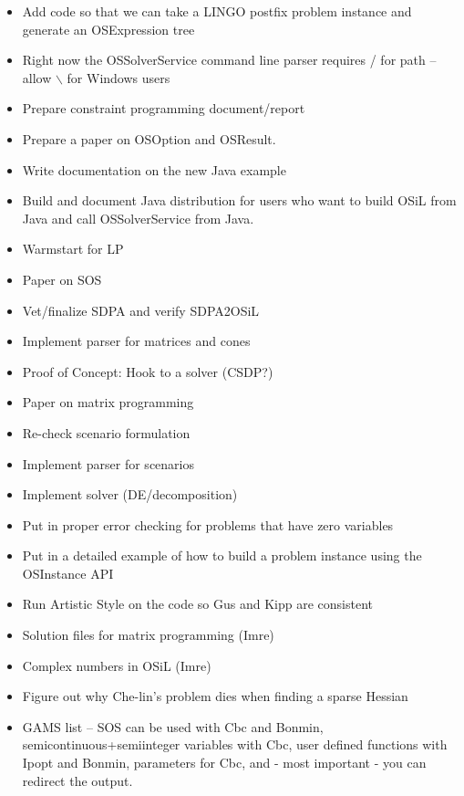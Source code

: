 \begin{itemize}
\item Add code so that we can take a LINGO postfix problem instance and generate an OSExpression tree

\item Right now the OSSolverService command line parser requires / for path -- allow {$\backslash$} for Windows users

\item Prepare constraint programming document/report

\item Prepare a paper on OSOption and OSResult.

\item Write documentation on the new Java example 

\item Build and document Java distribution for users who want to build OSiL from Java and 
call OSSolverService from Java. 

\item Warmstart for LP

\item Paper on SOS

\item Vet/finalize SDPA and verify SDPA2OSiL

\item Implement parser for matrices and cones

\item Proof of Concept: Hook to a solver (CSDP?)

\item Paper on matrix programming

\item Re-check scenario formulation

\item Implement parser for scenarios

\item Implement solver (DE/decomposition)

\item Put in proper error checking for problems that have zero variables

\item Put in a detailed example of how to build a problem instance using the OSInstance API

\item Run Artistic Style on the code so Gus and Kipp are consistent

\item Solution files for matrix programming (Imre)

\item Complex numbers in OSiL (Imre)

\item Figure out why Che-lin's problem dies when finding a sparse Hessian

\item GAMS list -- SOS can be used with Cbc and Bonmin, semicontinuous+semiinteger
variables with Cbc, user defined functions with Ipopt and Bonmin,
parameters for Cbc, and - most important - you can redirect the output.

\end{itemize}
